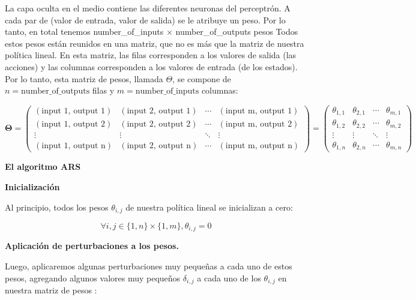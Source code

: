 \documentclass[]{book}
\begin{document}
La capa oculta en el medio contiene las diferentes neuronas del perceptrón. A cada par de (valor de entrada, valor de salida) se le atribuye un peso. Por lo tanto, en total tenemos number\_of\_inputs \(\times\) number\_of\_outputs pesos Todos estos pesos están reunidos en una matriz, que no es más que la matriz de nuestra política lineal. En esta matriz, las filas corresponden a los valores de salida (las acciones) y las columnas corresponden a los valores de entrada (de los estados). Por lo tanto, esta matriz de pesos, llamada \(\Theta\), se compone de \(n = \textrm{number\_of\_outputs}\) filas y \(m = \textrm{number\_of\_inputs}\) columnas:

\[
\boldsymbol{\Theta}
=
\begin{pmatrix}
(\textrm{input 1, output 1}) & (\textrm{input 2, output 1}) & \cdots & (\textrm{input m, output 1}) \\
(\textrm{input 1, output 2}) & (\textrm{input 2, output 2}) & \cdots & (\textrm{input m, output 2}) \\
\vdots & \vdots & \ddots & \vdots \\
(\textrm{input 1, output n}) & (\textrm{input 2, output n}) & \cdots & (\textrm{input m, output n})
\end{pmatrix}
=
\begin{pmatrix}
\theta_{1,1} & \theta_{2,1} & \cdots & \theta_{m,1} \\
\theta_{1,2} & \theta_{2,2} & \cdots & \theta_{m,2} \\
\vdots & \vdots & \ddots & \vdots \\
\theta_{1,n} & \theta_{2,n} & \cdots & \theta_{m,n}
\end{pmatrix}
\]

\textbf{El algoritmo ARS}

\textbf{Inicialización}

Al principio, todos los pesos \(\theta_{i, j}\) de nuestra política lineal se inicializan a cero:

\[\forall i,j \in \{1,n\}\times\{1,m\}, \theta_{i,j} = 0\]

\textbf{Aplicación de perturbaciones a los pesos.}

Luego, aplicaremos algunas perturbaciones muy pequeñas a cada uno de estos pesos, agregando algunos valores muy pequeños \(\delta_{i, j}\) a cada uno de los \(\theta_{i, j}\) en nuestra matriz de pesos :
\end{document}
